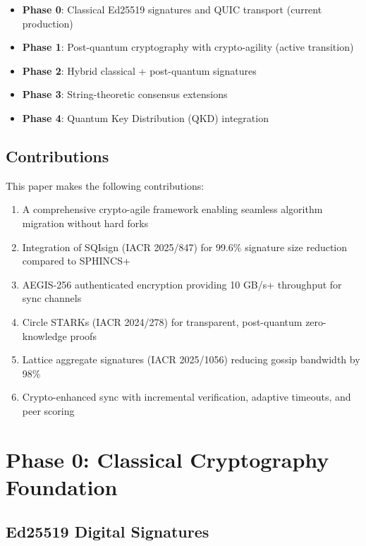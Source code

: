 \documentclass[11pt,a4paper]{article}
\begin{document}
\begin{itemize}
    \item \textbf{Phase 0}: Classical Ed25519 signatures and QUIC transport (current production)
    \item \textbf{Phase 1}: Post-quantum cryptography with crypto-agility (active transition)
    \item \textbf{Phase 2}: Hybrid classical + post-quantum signatures
    \item \textbf{Phase 3}: String-theoretic consensus extensions
    \item \textbf{Phase 4}: Quantum Key Distribution (QKD) integration
\end{itemize}

\subsection{Contributions}

This paper makes the following contributions:

\begin{enumerate}
    \item A comprehensive crypto-agile framework enabling seamless algorithm migration without hard forks
    \item Integration of SQIsign (IACR 2025/847) for 99.6\% signature size reduction compared to SPHINCS+
    \item AEGIS-256 authenticated encryption providing 10 GB/s+ throughput for sync channels
    \item Circle STARKs (IACR 2024/278) for transparent, post-quantum zero-knowledge proofs
    \item Lattice aggregate signatures (IACR 2025/1056) reducing gossip bandwidth by 98\%
    \item Crypto-enhanced sync with incremental verification, adaptive timeouts, and peer scoring
\end{enumerate}

\section{Phase 0: Classical Cryptography Foundation}

\subsection{Ed25519 Digital Signatures}
\end{document}
